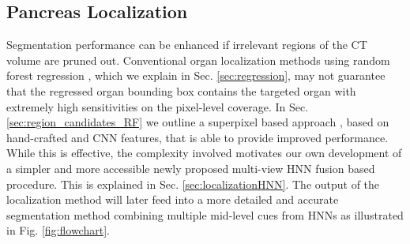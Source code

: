\documentclass[journal]{IEEEtran}
\begin{document}
\subsection{Pancreas Localization} \label{sec:localization}
Segmentation performance can be enhanced if irrelevant regions of the CT volume are pruned out. Conventional organ localization methods using random forest regression \cite{criminisi2013regression,laybirkbeck2013}, which we explain in Sec. \ref{sec:regression}, may not guarantee that the regressed organ bounding box contains the targeted organ with extremely high sensitivities on the pixel-level coverage. In Sec. \ref{sec:region_candidates_RF} we outline a superpixel based approach \cite{farag2014bottom}, based on hand-crafted and CNN features, that is able to provide improved performance. While this is effective, the complexity involved motivates our own development of a simpler and more accessible newly proposed multi-view HNN fusion based procedure. This is explained in Sec. \ref{sec:localizationHNN}. The output of the localization method will later feed into a more detailed and accurate segmentation method combining multiple mid-level cues from HNNs as illustrated in Fig. \ref{fig:flowchart}.
\end{document}
